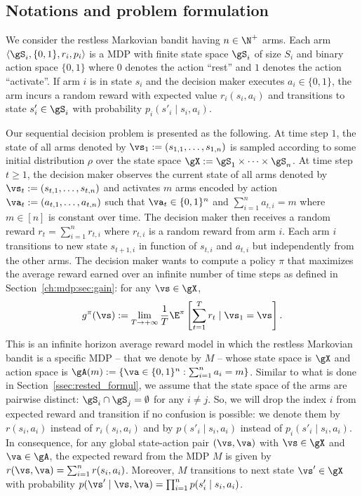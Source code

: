 \subsection{Notations and problem formulation}
\label{ssec:restless_formul}

We consider the restless Markovian bandit having $n\in\N^+$ arms.
Each arm $\langle\gS_i, \{0,1\}, r_i, p_i\rangle$ is a MDP with finite state space $\gS_i$ of size $S_i$ and binary action space $\{0,1\}$ where $0$ denotes the action ``rest'' and $1$ denotes the action ``activate''.
If arm $i$ is in state $s_i$ and the decision maker executes $a_i\in\{0,1\}$, the arm incurs a random reward with expected value $r_i(s_i,a_i)$ and transitions to state $s'_i\in\gS_i$ with probability $p_i(s'_i\mid s_i,a_i)$.

Our sequential decision problem is presented as the following.
At time step $1$, the state of all arms denoted by $\vs_1:=(s_{1,1},\dots,s_{1,n})$ is sampled according to some initial distribution $\rho$ over the state space $\gX:=\gS_1\times\dots\times\gS_n$.
At time step $t\ge1$, the decision maker observes the current state of all arms denoted by $\vs_t:=(s_{t,1},\dots,s_{t,n})$ and activates $m$ arms encoded by action $\va_t:=(a_{t,1},\dots,a_{t,n})$ such that $\va_t\in\{0,1\}^n$ and $\sum_{i=1}^{n} a_{t,i}=m$ where $m\in[n]$ is constant over time.
The decision maker then receives a random reward $r_t=\sum_{i=1}^{n}r_{t,i}$ where $r_{t,i}$ is a random reward from arm $i$.
Each arm $i$ transitions to new state $s_{t+1,i}$ in function of $s_{t,i}$ and $a_{t,i}$ but independently from the other arms.
The decision maker wants to compute a policy $\pi$ that maximizes the average reward earned over an infinite number of time steps as defined in Section~\ref{ch:mdp:sec:gain}: for any $\vs\in\gX$,
\begin{equation}
    \label{ch:mb:eq:gain_defn}
    g^\pi(\vs) := \lim_{T\to+\infty}\frac1T \E^\pi\left[ \sum_{t=1}^{T} r_t \mid \vs_1=\vs\right].
\end{equation}
This is an infinite horizon average reward model in which the restless Markovian bandit is a specific MDP -- that we denote by $M$ -- whose state space is $\gX$ and action space is $\gA(m):=\{\va\in\{0,1\}^n : \sum_{i=1}^{n}a_i =m\}$.
Similar to what is done in Section~\ref{ssec:rested_formul}, we assume that the state space of the arms are pairwise distinct: $\gS_i\cap\gS_j=\emptyset$ for any $i\neq j$.
So, we will drop the index $i$ from expected reward and transition if no confusion is possible: we denote them by $r(s_i,a_i)$ instead of $r_i(s_i,a_i)$ and by $p(s'_i\mid s_i,a_i)$ instead of $p_i(s'_i\mid s_i,a_i)$.
In consequence, for any global state-action pair $(\vs,\va)$ with $\vs\in\gX$ and $\va\in\gA$, the expected reward from the MDP $M$ is given by $r(\vs,\va)=\sum_{i=1}^{n}r(s_i,a_i)$.
Moreover, $M$ transitions to next state $\vs'\in\gX$ with probability $p(\vs'\mid \vs,\va)=\prod_{i=1}^n p(s'_i\mid s_i,a_i)$.

